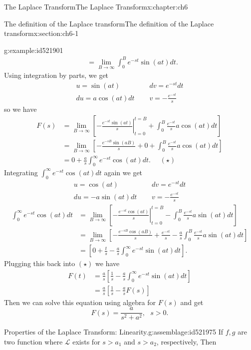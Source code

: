 \documentclass[oneside,10pt,]{book}
\numberwithin{equation}{section}
\numberwithin{equation}{section}
\newcommand{\amp}{&}
\begin{document}
\begin{chapterptx}{The Laplace Transform}{}{The Laplace Transform}{}{}{x:chapter:ch6}
\begin{sectionptx}{The definition of the Laplace transform}{}{The definition of the Laplace transform}{}{}{x:section:ch6-1}
\begin{example}{}{g:example:id521901}
\begin{align*}
\amp =\lim_{B\to\infty}\int_{0}^{B}e^{-st}\sin(at)dt.
\end{align*}
Using integration by parts, we get%
\begin{align*}
u=\sin(at)\,\,\,\,\,\,\,\, \amp dv=e^{-st}dt\\
du=a\cos(at)dt\,\,\,\,\,\,\,\, \amp v=-\frac{e^{-st}}{s}
\end{align*}
so we have%
\begin{align*}
F(s) \amp =\lim_{B\to\infty}\left[\left.-\frac{e^{-st}\sin(at)}{s}\right|_{t=0}^{t=B}+\int_{0}^{B}\frac{e^{-st}}{s}a\cos(at)dt\right]\\
\amp =\lim_{B\to\infty}\left[-\frac{e^{-sB}\sin(aB)}{s}+0+\int_{0}^{B}\frac{e^{-st}}{s}a\cos(at)dt\right]\\
\amp =0+\frac{a}{s}\int_{0}^{\infty}e^{-st}\cos(at)dt.\,\,\,\,\,\,\,\,(\star)
\end{align*}
Integrating \(\int_{0}^{\infty}e^{-st}\cos(at)dt\) again we get%
\begin{align*}
u=\cos(at)\,\,\,\,\,\,\,\, \amp dv=e^{-st}dt\\
du=-a\sin(at)dt\,\,\,\,\,\,\,\, \amp v=-\frac{e^{-st}}{s}
\end{align*}
%
\begin{align*}
\int_{0}^{\infty}e^{-st}\cos(at)dt \amp =\lim_{B\to\infty}\left[\left.-\frac{e^{-st}\cos(at)}{s}\right|_{t=0}^{t=B}-\int_{0}^{B}\frac{e^{-st}}{s}a\sin(at)dt\right]\\
\amp =\lim_{B\to\infty}\left[-\frac{e^{-sB}\cos(aB)}{s}+\frac{e^{-st}}{s}-\frac{a}{s}\int_{0}^{B}\frac{e^{-st}}{s}a\sin(at)dt\right]\\
\amp =\left[0+\frac{t}{s}-\frac{a}{s}\int_{0}^{\infty}e^{-st}\sin(at)dt\right].
\end{align*}
Plugging this back into \((\star)\) we have%
\begin{align*}
F(t) \amp =\frac{a}{s}\left[\frac{1}{s}-\frac{a}{s}\int_{0}^{\infty}e^{-st}\sin(at)dt\right]\\
\amp =\frac{a}{s}\left[\frac{1}{s}-\frac{a}{s}F(s)\right]
\end{align*}
Then we can solve this equation using algebra for \(F(s)\) and get%
\begin{equation*}
F(s)=\frac{a}{s^{2}+a^{2}},\,\,\,\,s>0.
\end{equation*}
%
\end{example}
\begin{assemblage}{Properties of the Laplace Transform: Linearity.}{g:assemblage:id521975}%
If \(f,g\) are two function where \(\mathcal{L}\) exists for \(s>a_{1}\) and \(s>a_{2}\), respectively, Then%

\end{assemblage}
\end{sectionptx}
\end{chapterptx}
\end{document}
